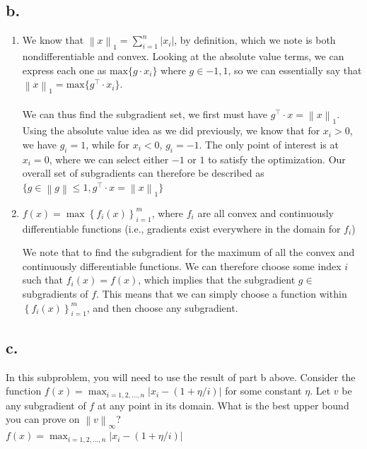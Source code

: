 \documentclass{article}
\newcommand{\1}{\mathbf{1}}
\newcommand{\norm}[1]{\left\|#1\right\|}
\begin{document}
{\begin{enumerate}
\end{enumerate}

\subsection*{b.}

\begin{enumerate}
  \item 
  We know that $\norm{x}_1 = \sum_{i=1}^{n} |x_i|$, by definition, which we note is both nondifferentiable and convex. Looking at the absolute value terms, we can express each one as $\text{max} \{ g \cdot x_i \}$ where $g \in {-1, 1}$, so we can essentially say that $\norm{x}_1 = \text{max}\{g^\top \cdot x_i\}$. \\ \\
  We can thus find the subgradient set, we first must have $g^\top \cdot x = \norm{x}_1$. Using the absolute value idea as we did previously, we know that for $x_i > 0$, we have $g_i = 1$, while for $x_i < 0$, $g_i = -1$. The only point of interest is at $x_i = 0$, where we can select either $-1$ or $1$ to satisfy the optimization. Our overall set of subgradients can therefore be described as \\
  $\{g \in \norm{g} \leq 1, g^\top \cdot x = \norm{x}_1\}$

  \item $f(x) = \max \left\{f_i(x)\right\}_{i =1}^m$, where $f_i$ are all convex and continuously differentiable functions (i.e., gradients exist everywhere in the domain for $f_i$)
  
  We note that to find the subgradient for the maximum of all the convex and continuously differentiable functions. We can therefore choose some index $i$ such that $f_i(x) = f(x)$, which implies that the subgradient $g \in $ subgradients of $f$. This means that we can simply choose a function within $\left\{f_i(x)\right\}_{i =1}^m$, and then choose any subgradient. 

\end{enumerate}

\subsection*{c.}

In this subproblem, you will need to use the result of part b above. Consider the function $f(x) = \max_{i = 1, 2, \dots, n} |x_i - (1 + \eta/i)|$ for some constant $\eta$. Let $v$ be any subgradient of $f$ at any point in its domain. What is the best upper bound you can prove on $\norm{v}_{\infty}$? \\

$f(x) = \max_{i = 1, 2, \dots, n} |x_i - (1 + \eta/i)|$

}
\end{document}
